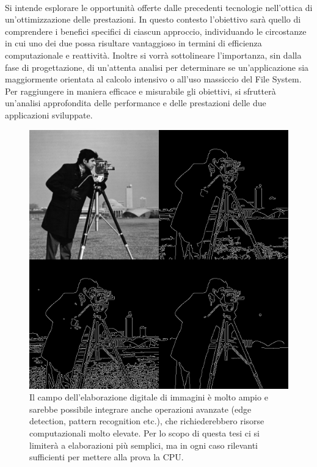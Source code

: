 \\Si intende esplorare le opportunità offerte dalle precedenti tecnologie nell'ottica di un'ottimizzazione delle prestazioni. In questo contesto l'obiettivo sarà quello di comprendere i benefici specifici di ciascun approccio, individuando le circostanze in cui uno dei due possa risultare vantaggioso in termini di efficienza computazionale e reattività. Inoltre si vorrà sottolineare l'importanza, sin dalla fase di progettazione, di un'attenta analisi per determinare se un'applicazione sia maggiormente orientata al calcolo intensivo o all'uso massiccio del File System. 
Per raggiungere in maniera efficace e misurabile gli obiettivi, si sfrutterà un'analisi approfondita delle performance e delle prestazioni delle due applicazioni sviluppate.
\begin{figure}
        \begin{center}
                \includegraphics[width=0.7\columnwidth]{images/imageProc.jpg}
        \end{center}
        \caption{Il campo dell'elaborazione digitale di immagini è molto ampio e sarebbe possibile integrare anche operazioni avanzate (edge detection, pattern recognition etc.), che richiederebbero risorse computazionali molto elevate. Per lo scopo di questa tesi ci si limiterà a elaborazioni più semplici, ma in ogni caso rilevanti sufficienti per mettere alla prova la CPU.}
        \label{fig:imageProc}
\end{figure} 
